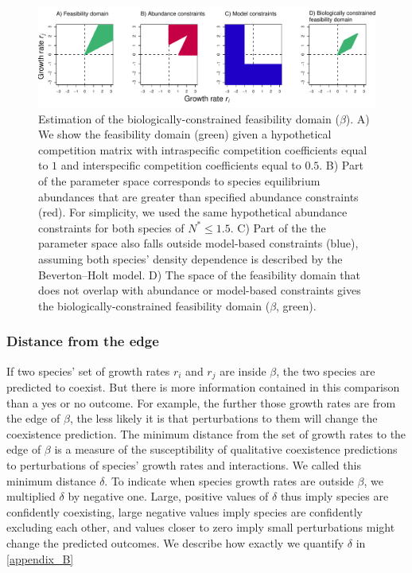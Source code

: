 \begin{refsection}
\begin{figure}[H]
  \centerline{\includegraphics[width=1\textwidth]{figures/chapter3_fig1.pdf}}
  \caption[Estimation of the biologically-constrained feasibility domain]{Estimation of the biologically-constrained feasibility domain ($\beta$). A) We show the feasibility domain (green) given a hypothetical competition matrix with intraspecific competition coefficients equal to $1$ and interspecific competition coefficients equal to $0.5$. B) Part of the parameter space corresponds to species equilibrium abundances that are greater than specified abundance constraints (red). For simplicity, we used the same hypothetical abundance constraints for both species of $N^* \le 1.5$. C) Part of the the parameter space also falls outside model-based constraints (blue), assuming both species' density dependence is described by the Beverton--Holt model. D) The space of the feasibility domain that does not overlap with abundance or model-based constraints gives the biologically-constrained feasibility domain ($\beta$, green). }
  \label{fig:domain}
\end{figure}


\subsubsection*{Distance from the edge}

If two species' set of growth rates $r_{i}$ and $r_{j}$ are inside $\beta$, the two species are predicted to coexist. But there is more information contained in this comparison than a yes or no outcome. For example, the further those growth rates are from the edge of $\beta$, the less likely it is that perturbations to them will change the coexistence prediction. The minimum distance from the set of growth rates to the edge of $\beta$ is a measure of the susceptibility of qualitative coexistence predictions to perturbations of species' growth rates and interactions. We called this minimum distance $\delta$. To indicate when species growth rates are outside $\beta$, we multiplied $\delta$ by negative one. Large, positive values of $\delta$  thus imply species are confidently coexisting, large negative values imply species are confidently excluding each other, and values closer to zero imply small perturbations might change the predicted outcomes. We describe how exactly we quantify $\delta$ in \autoref{appendix_B}



\end{refsection}
